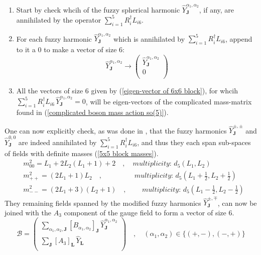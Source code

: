 %
%
\begin{enumerate}
%
\item Start by check whcih of the fuzzy spherical harmonic $\hat{Y}^{\alpha_1, \alpha_2}_{\mathbf{J}}$, if any, are annihilated by the operator $\sum_{i=1}^5 R_{i}^\dagger L_{i6}$.
%
\item For each fuzzy harmonic $\hat{Y}^{\alpha_1, \alpha_2}_{\mathbf{J}}$ which is annihilated by $\sum_{i=1}^5 R_{i}^\dagger L_{i6}$, append to it a $0$ to make a vector of size $6$:
%
%
\begin{equation}\label{eigen-vector of 6x6 block}
\hat{Y}^{\alpha_1, \alpha_2}_{\mathbf{J}} \to
\left( \begin{array}{c}
\hat{Y}^{\alpha_1, \alpha_2}_{\mathbf{J}} \\
0 \\
\end{array} \right)
\end{equation}
%
%
\item All the vectors of size $6$ given by (\ref{eigen-vector of 6x6 block}), for whcih $\sum_{i=1}^5 R_{i}^\dagger L_{i6} \, \hat{Y}^{\alpha_1, \alpha_2}_{\mathbf{J}} = 0$, will be eigen-vectors of the complicated mass-matrix found in (\ref{complicated boson mass action so(5)}).
%
\end{enumerate}
%
%
One can now explicitly check, as was done in \cite{One-point functions in D3-D7 SO(5)}, that the fuzzy harmonics $\hat{Y}^{\pm, \pm}_{\mathbf{J}}$ and $\hat{Y}^{0, 0}_{\mathbf{J}}$ are indeed annihilated by $\sum_{i=1}^5 R_{i}^\dagger L_{i6}$, and thus they each span sub-spaces of fields with definite masses (\ref{5x5 block masses}).
%
%
\begin{align}
& m^2_{00} = L_1 + 2 L_2 (L_1 + 1) + 2
%
\quad , \quad
%
\textit{multiplicity: } d_5(L_1, L_2)
\\
& m^2_{++} = (2 L_1 + 1) L_2
%
\quad , \quad\quad\quad\quad\;\;
%
\textit{multiplicity: } d_5 \left( L_1 + \tfrac{1}{2}, L_2 + \tfrac{1}{2} \right)
\\
& m^2_{--} = (2 L_1 + 3) (L_2 + 1)
%
\quad , \quad\quad\,
%
\textit{multiplicity: } d_5 \left( L_1 - \tfrac{1}{2}, L_2 - \tfrac{1}{2} \right)
\end{align}
%
%
They remaining fields spanned by the modified fuzzy harmonics $\hat{Y}^{\pm, \mp}_{\mathbf{J}}$, can now be joined with the $A_3$ component of the gauge field to form a vector of size $6$.
%
%
\begin{equation}\label{non-diagonal sub-space vetor}
\mathcal{B} = \left( \begin{array}{c}
\sum_{\alpha_1, \alpha_2, \mathbf{J}}
[B_{\alpha_1, \alpha_2}]_{\mathbf{J}} \,
\hat{Y}^{\alpha_1, \alpha_2}_{\mathbf{J}} \\
\sum_{\mathbf{J}}
[A_3]_{\mathbf{L}} \, 
\hat{Y}_{\mathbf{L}} \\
\end{array} \right)
%
\quad , \quad
%
(\alpha_1, \alpha_2) \in \{ (+,-), (-,+) \}
\end{equation}
